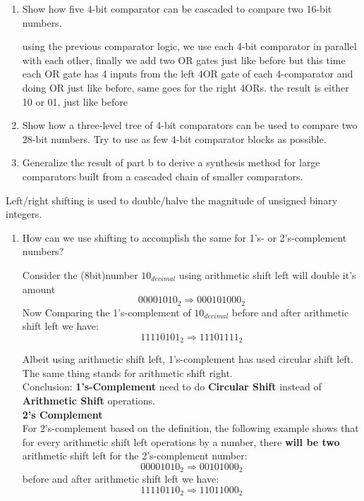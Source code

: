 \documentclass[16pt,answers]{exam}
\begin{document}
\begin{questions}
\begin{enumerate}
\begin{solution}
\begin{figure}[H]
		\end{figure}
	\end{solution}
	\item Show how five 4-bit comparator can be cascaded to compare two 16-bit
	numbers.
	\begin{solution}
		using the previous comparator logic, we use each 4-bit comparator in parallel with each other, finally we add two OR gates just like before but this time each OR gate has 4 inputs from the left 4OR gate of each 4-comparator and doing OR just like before, same goes for the right 4ORs. the result is either 10 or 01, just like before 
	\end{solution}
	\item Show how a three-level tree of 4-bit comparators can be used to compare two
	28-bit numbers. Try to use as few 4-bit comparator blocks as possible.
	\item Generalize the result of part b to derive a synthesis method for large
	comparators built from a cascaded chain of smaller comparators.
\end{enumerate}

\question Left/right shifting is used to double/halve the magnitude of unsigned binary
integers.
\begin{enumerate}
	\item How can we use shifting to accomplish the same for 1’s- or 2’s-complement
	numbers?
	\begin{solution}
		Consider the (8bit)number \(10_{decimal}\) using arithmetic shift left will double it's amount
		\[
			00001010_{2} \Rightarrow 000101000_{2}
		\]
		Now Comparing the 1's-complement of \(10_{decimal}\) before and after arithmetic shift left we have:
		\[
			11110101_{2} \Longrightarrow 11101111_{2}
		\]
		
		Albeit using arithmetic shift left, 1's-complement has used circular shift left. The same thing stands for arithmetic shift right.\\
		Conclusion: \textbf{1's-Complement} need to do\textbf{ Circular Shift} instead of \textbf{Arithmetic Shift} operations.\\
			\textbf{2's Complement}\\
		For 2's-complement based on the definition, the following example shows that for every arithmetic shift left operations by a number, there\textbf{ will be two} arithmetic shift left for the 2's-complement number:\[
			0000 1010_{2} \Rightarrow 0010 1000_{2}
		\]
		before and after arithmetic shift left we have:
		\[
			1111 0110_{2} \Rightarrow 1101 1000_{2}
		\]
	

\end{solution}
\end{enumerate}
\end{questions}
\end{document}
